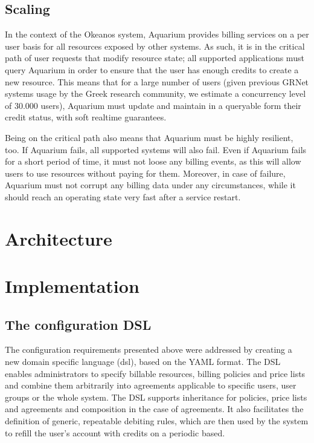 \documentclass[preprint,10pt]{sigplanconf}
\begin{document}
\subsection{Scaling}

In the context of the Okeanos system, Aquarium provides billing services on a
per user basis for all resources exposed by other systems. As such, it is in
the critical path of user requests that modify resource state; all supported
applications must query Aquarium in order to ensure that the user has enough
credits to create a new resource. This means that for a large number of users
(given previous GRNet systems usage by the Greek research community, we
estimate a concurrency level of 30.000 users), Aquarium must update and
maintain in a queryable form their credit status, 
with soft realtime guarantees. 

Being on the critical path also means that Aquarium must be highly resilient,
too. If Aquarium fails, all supported systems will also fail. Even if Aquarium
fails for a short period of time, it must not loose any billing events, as this
will allow users to use resources without paying for them. Moreover, in case of
failure, Aquarium must not corrupt any billing data under any circumstances,
while it should reach an operating state very fast after a service restart.

\section{Architecture}



\section{Implementation}

\subsection{The configuration DSL}

The configuration requirements presented above were addressed by creating a new
domain specific language ({\sc dsl}), based on the YAML format.  The DSL
enables administrators to specify billable resources, billing policies and
price lists and combine them arbitrarily into agreements applicable to specific
users, user groups or the whole system. 
The DSL supports inheritance for policies, price lists and agreements and composition in the case of agreements.
It also facilitates the
definition of generic, repeatable debiting rules, which are then used by the
system to refill the user's account with credits on a periodic based.
\end{document}

